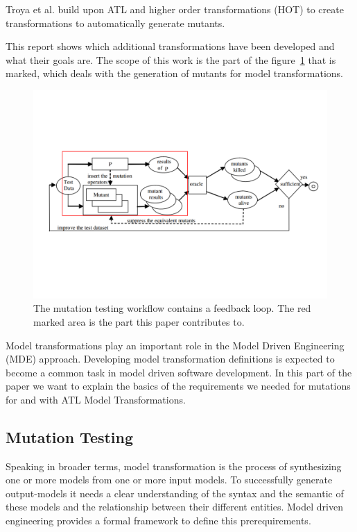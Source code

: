 \documentclass{llncs}
\begin{document}
Troya et al. \cite{troya:2015} build upon ATL and higher order transformations
(HOT) to create transformations to automatically generate mutants.

This report shows which additional transformations have been developed and what
their goals are. The scope of this work is the part of the
figure~\ref{fig:Marked_Mutation_Process} that is marked, which deals with the
generation of mutants for model transformations.

\begin{figure}
	\centering
	\includegraphics[angle=0,width=1\textwidth]{figures/Marked_Mutation_Process.pdf}
	\caption{The mutation testing workflow contains a feedback loop. The red marked area is the part this paper contributes to.\cite{MatMottu2006}}
	\label{fig:Marked_Mutation_Process}
\end{figure}

Model transformations play an important role in the Model Driven Engineering
(MDE) approach. Developing model transformation definitions is expected to
become a common task in model driven software development. \cite{atl:frederic}
In this part of the paper we want to explain the basics of the requirements we needed for mutations for and with ATL Model Transformations.

\subsection{Mutation Testing}

Speaking in broader terms, model transformation is the process of synthesizing one or more models from one or more input models. To successfully generate output-models it needs a clear understanding of the syntax and the semantic of these models and the relationship between their different entities. Model driven engineering provides a formal framework to define this prerequirements.\cite{Sendall:2003}
\end{document}
